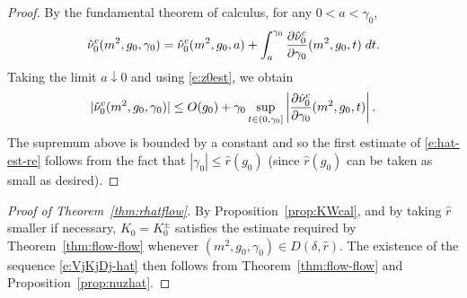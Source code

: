 \begin{proof}
By the fundamental theorem of calculus, for any $0 < a < \gamma_0$,
\begin{equation}
\hat\nu_0^c(m^2, g_0, \gamma_0)
  =
\hat\nu_0^c(m^2, g_0, a)
  +
\int_a^{\gamma_0} \frac{\partial \hat\nu_0^c}{\partial \gamma_0} (m^2, g_0, t) \; dt.
\end{equation}
Taking the limit $a\downarrow 0$ and using \eqref{e:z0est}, we obtain
\begin{equation}
|\hat\nu_0^c(m^2, g_0, \gamma_0)|
  \leq
O(g_0)
  +
\gamma_0
\sup_{t \in (0, \gamma_0]}
\left|\frac{\partial \hat\nu_0^c}{\partial \gamma_0}(m^2, g_0, t)\right|.
\end{equation}
The supremum above is bounded by a constant and so
the first estimate of \eqref{e:hat-est-re} %
follows from the fact that $|\gamma_0| \leq \hat r(g_0)$
(since $\hat r(g_0)$ can be taken as small as desired).
\end{proof}

\begin{proof}[Proof of Theorem~\ref{thm:rhatflow}]
By Proposition~\ref{prop:KWcal},
and by taking $\hat r$ smaller if necessary,
$K_0 = K^\pm_0$ satisfies the estimate required by Theorem~\ref{thm:flow-flow}
whenever $(m^2, g_0, \gamma_0) \in D(\delta, \hat r)$. The
existence of the sequence \eqref{e:VjKjDj-hat} then follows from
Theorem~\ref{thm:flow-flow} and Proposition~\ref{prop:nuzhat}.
\end{proof}
